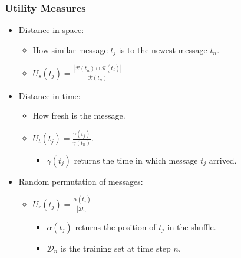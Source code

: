 \documentclass[14pt]{beamer}
\begin{document}
\begin{frame}\frametitle{Utility Measures}
\begin{itemize}
\item Distance in space:
\begin{itemize}
\item How similar message $t_j$ is to the newest message $t_n$.
\item $U_s(t_j)=\frac{|\mathcal{R}(t_n) \cap \mathcal{R}(t_j)|}{|\mathcal{R}(t_n)|}$
\end{itemize}
\item Distance in time:
\begin{itemize}
\item How fresh is the message.
\item $U_t(t_j)=\frac{\gamma(t_j)}{\gamma(t_n)}$.
\begin{itemize}
\item $\gamma(t_j)$ returns the time in which message $t_j$ arrived.
\end{itemize}
\end{itemize}
\item Random permutation of messages:
\begin{itemize}
\item $U_r(t_j)=\frac{\alpha(t_j)}{|\mathcal{D}_n|}$
\begin{itemize}
\item $\alpha(t_j)$ returns the position of $t_j$ in the shuffle.
\item $\mathcal{D}_n$ is the training set at time step $n$.
\end{itemize}
\end{itemize}
\end{itemize}

\end{frame}
\end{document}
